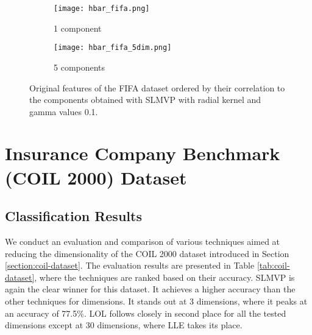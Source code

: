 \begin{figure}[!ht]
    \centering
    \begin{subfigure}{\textwidth}
        \centering
        \texttt{[image: hbar\_fifa.png]}
        \caption{1 component}
    \end{subfigure}%

    \begin{subfigure}{\textwidth}
        \centering
        \texttt{[image: hbar\_fifa\_5dim.png]}
        \caption{5 components}
    \end{subfigure}
    \caption{Original features of the FIFA dataset ordered by their correlation to the components obtained with SLMVP with radial kernel and gamma values 0.1.}
    \label{fig:hbar-fifa}
\end{figure}


\section{Insurance Company Benchmark (COIL 2000) Dataset}

\subsection{Classification Results}

We conduct an evaluation and comparison of various techniques aimed at reducing the dimensionality of the COIL 2000 dataset introduced in Section \ref{section:coil-dataset}. The evaluation results are presented in Table \ref{tab:coil-dataset}, where the techniques are ranked based on their accuracy. SLMVP is again the clear winner for this dataset. It achieves a higher accuracy than the other techniques for dimensions. It stands out at 3 dimensions, where it peaks at an accuracy of 77.5\%. LOL follows closely in second place for all the tested dimensions except at 30 dimensions, where LLE takes its place.

